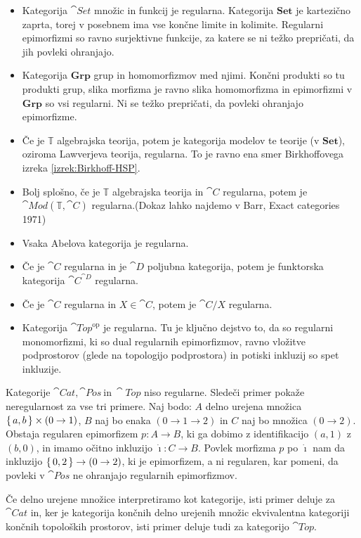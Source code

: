 \documentclass[../kategoricna_logika.tex]{subfiles}
\begin{document}
\begin{primer}
  \hfill
  \begin{itemize}
  \item Kategorija $\cat{Set}$ množic in funkcij je
    regularna. Kategorija $\mathbf{Set}$ je kartezično zaprta, torej v
    posebnem ima vse končne limite in kolimite.  Regularni epimorfizmi
    so ravno surjektivne funkcije, za katere se ni težko prepričati,
    da jih povleki ohranjajo.
  \item Kategorija $\mathbf{Grp}$ grup in homomorfizmov med njimi.
    Končni produkti so tu produkti grup, slika morfizma je ravno slika
    homomorfizma in epimorfizmi v $\mathbf{Grp}$ so vsi regularni. Ni se
    težko prepričati, da povleki ohranjajo epimorfizme.
  \item Če je $\mathbb{T}$ algebrajska teorija, potem je kategorija
    modelov te teorije (v $\mathbf{Set}$), oziroma Lawverjeva teorija,
    regularna.  To je ravno ena smer Birkhoffovega izreka
    \ref{izrek:Birkhoff-HSP}.
  \item Bolj splošno, če je $\mathbb{T}$ algebrajska teorija in
    $\cat{C}$ regularna, potem je $\cat{Mod}(\mathbb{T}, \cat{C})$
    regularna.(Dokaz lahko najdemo v Barr, Exact categories 1971)
  \item Vsaka Abelova kategorija je regularna.
  \item Če je $\cat{C}$ regularna in je $\cat{D}$ poljubna kategorija,
    potem je funktorska kategorija $\cat{C}^{\cat{D}}$ regularna.
  \item Če je $\cat{C}$ regularna in $X \in \cat{C}$, potem je
    $\cat{C}/X$ regularna.
  \item Kategorija $\cat{Top}^{\mathrm{op}}$ je regularna. Tu je
    ključno dejstvo to, da so regularni monomorfizmi, ki so dual
    regularnih epimorfizmov, ravno vložitve podprostorov (glede na
    topologijo podprostora) in potiski inkluzij so spet inkluzije.
  \end{itemize}
\end{primer}
\begin{primer}
  Kategorije $\cat{Cat}, \cat{Pos}\ \text{in}\ \cat{Top}$ niso
  regularne.  Sledeči primer pokaže neregularnost za vse tri primere.
  Naj bodo: $A$ delno urejena množica $\left\lbrace\,a, b\,\right\rbrace \times (0 \to 1)$,
  $B$ naj bo enaka $(0 \to 1 \to 2)$ in $C$ naj bo množica
  $(0 \to 2)$.  Obstaja regularen epimorfizem ${p : A \to B}$, ki ga
  dobimo z identifikacijo $(a,1)$ z $(b, 0)$, in imamo očitno
  inkluzijo ${\dot{\imath} : C \to B}$. Povlek morfizma $p$ po
  $\dot{\imath}$ nam da inkluzijo $\left\lbrace\,0, 2\,\right\rbrace \to (0 \to 2)$, ki je
  epimorfizem, a ni regularen, kar pomeni, da povleki v $\cat{Pos}$ ne
  ohranjajo regularnih epimorfizmov.

  Če delno urejene množice interpretiramo kot kategorije, isti primer
  deluje za $\cat{Cat}$ in, ker je kategorija končnih delno urejenih
  množic ekvivalentna kategoriji končnih topoloških prostorov, isti
  primer deluje tudi za kategorijo $\cat{Top}$.
\end{primer}
\end{document}
